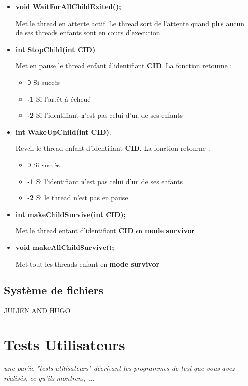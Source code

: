 \documentclass{article}
\begin{document}
\begin{itemize}
	\item 
	\textbf{void WaitForAllChildExited();}
	
	Met le thread en attente actif. Le thread sort de l'attente quand plus aucun de ses threads enfants sont en cours d'execution
	
	\item 
	\textbf{int StopChild(int CID)}
	
	Met en pause le thread enfant d'identifiant \textbf{CID}. 
	La fonction retourne :		
		\begin{itemize}
			\item \textbf{0} Si succès
			\item \textbf{-1} Si l'arrêt à échoué
			\item \textbf{-2} Si l'identifiant n'est pas celui d'un de ses enfants
		\end{itemize}				
		
	
	\item 
	\textbf{int WakeUpChild(int CID);}
	
		
	Reveil le thread enfant d'identifiant \textbf{CID}. 
	La fonction retourne :		
		\begin{itemize}
			\item \textbf{0} Si succès
			\item \textbf{-1} Si l'identifiant n'est pas celui d'un de ses enfants
			\item \textbf{-2} Si le thread n'est pas en pause
		\end{itemize}	
	
	\item 
	\textbf{int makeChildSurvive(int CID);}
	
	Met le thread enfant d'identifiant \textbf{CID} en \textbf{mode survivor}
	
	\item 
	\textbf{void makeAllChildSurvive();}
	
	Met tout les threads enfant en \textbf{mode survivor}
\end{itemize}

\subsection{Système de fichiers}
JULIEN AND HUGO

\section{Tests Utilisateurs}
\textit{une partie "tests utilisateurs" décrivant les programmes de test que vous avez réalisés, ce qu'ils montrent, ...}
\vspace{5mm}
\end{document}
